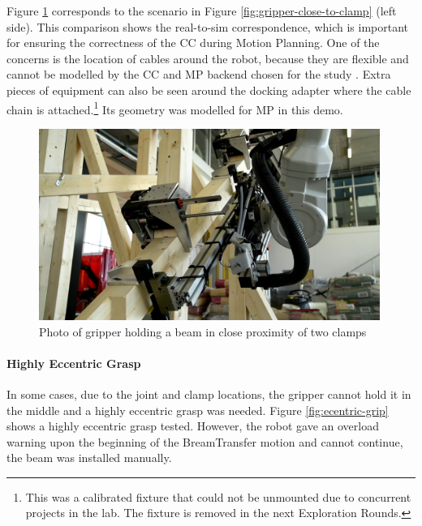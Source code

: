 Figure \ref{fig:gripper-close-to-clamp-photo} corresponds to the scenario in Figure \ref{fig:gripper-close-to-clamp}  (left side). This comparison shows the real-to-sim correspondence, which is important for ensuring the correctness of the CC during Motion Planning. One of the concerns is the location of cables around the robot, because they are flexible and cannot be modelled by the CC and MP backend chosen for the study .
Extra pieces of equipment can also be seen around the docking adapter where the cable chain is attached.\footnote{This was a calibrated fixture that could not be unmounted due to concurrent projects in the lab. The fixture is removed in the next Exploration Rounds.} Its geometry was modelled for MP in this demo.

\begin{figure}[!h]
    \centering
    \includegraphics[width=0.99\textwidth]{images/05/image29.png}
    \caption{Photo of gripper holding a beam in close proximity of two clamps}
    \label{fig:gripper-close-to-clamp-photo}
\end{figure}

\paragraph{Highly Eccentric Grasp}

In some cases, due to the joint and clamp locations, the gripper cannot hold it in the middle and a highly eccentric grasp was needed. Figure \ref{fig:ecentric-grip} shows a highly eccentric grasp tested. However, the robot gave an overload warning upon the beginning of the BreamTransfer motion and cannot continue, the beam was installed manually. 

